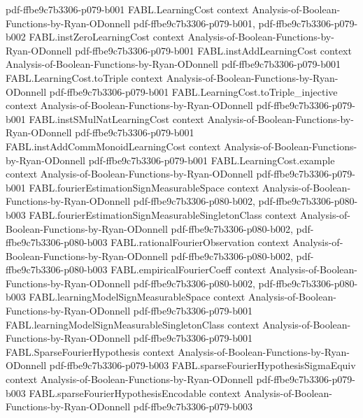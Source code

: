 \begin{theorem}
  {pdf-ffbe9c7b3306-p079-b001}
\proofstep
  {FABL.LearningCost}
  {context}
  {Analysis-of-Boolean-Functions-by-Ryan-ODonnell}
  {pdf-ffbe9c7b3306-p079-b001,
    pdf-ffbe9c7b3306-p079-b002}
\proofstep
  {FABL.instZeroLearningCost}
  {context}
  {Analysis-of-Boolean-Functions-by-Ryan-ODonnell}
  {pdf-ffbe9c7b3306-p079-b001}
\proofstep
  {FABL.instAddLearningCost}
  {context}
  {Analysis-of-Boolean-Functions-by-Ryan-ODonnell}
  {pdf-ffbe9c7b3306-p079-b001}
\proofstep
  {FABL.LearningCost.toTriple}
  {context}
  {Analysis-of-Boolean-Functions-by-Ryan-ODonnell}
  {pdf-ffbe9c7b3306-p079-b001}
\proofstep
  {FABL.LearningCost.toTriple_injective}
  {context}
  {Analysis-of-Boolean-Functions-by-Ryan-ODonnell}
  {pdf-ffbe9c7b3306-p079-b001}
\proofstep
  {FABL.instSMulNatLearningCost}
  {context}
  {Analysis-of-Boolean-Functions-by-Ryan-ODonnell}
  {pdf-ffbe9c7b3306-p079-b001}
\proofstep
  {FABL.instAddCommMonoidLearningCost}
  {context}
  {Analysis-of-Boolean-Functions-by-Ryan-ODonnell}
  {pdf-ffbe9c7b3306-p079-b001}
\proofstep
  {FABL.LearningCost.example}
  {context}
  {Analysis-of-Boolean-Functions-by-Ryan-ODonnell}
  {pdf-ffbe9c7b3306-p079-b001}
\proofstep
  {FABL.fourierEstimationSignMeasurableSpace}
  {context}
  {Analysis-of-Boolean-Functions-by-Ryan-ODonnell}
  {pdf-ffbe9c7b3306-p080-b002,
    pdf-ffbe9c7b3306-p080-b003}
\proofstep
  {FABL.fourierEstimationSignMeasurableSingletonClass}
  {context}
  {Analysis-of-Boolean-Functions-by-Ryan-ODonnell}
  {pdf-ffbe9c7b3306-p080-b002,
    pdf-ffbe9c7b3306-p080-b003}
\proofstep
  {FABL.rationalFourierObservation}
  {context}
  {Analysis-of-Boolean-Functions-by-Ryan-ODonnell}
  {pdf-ffbe9c7b3306-p080-b002,
    pdf-ffbe9c7b3306-p080-b003}
\proofstep
  {FABL.empiricalFourierCoeff}
  {context}
  {Analysis-of-Boolean-Functions-by-Ryan-ODonnell}
  {pdf-ffbe9c7b3306-p080-b002,
    pdf-ffbe9c7b3306-p080-b003}
\proofstep
  {FABL.learningModelSignMeasurableSpace}
  {context}
  {Analysis-of-Boolean-Functions-by-Ryan-ODonnell}
  {pdf-ffbe9c7b3306-p079-b001}
\proofstep
  {FABL.learningModelSignMeasurableSingletonClass}
  {context}
  {Analysis-of-Boolean-Functions-by-Ryan-ODonnell}
  {pdf-ffbe9c7b3306-p079-b001}
\proofstep
  {FABL.SparseFourierHypothesis}
  {context}
  {Analysis-of-Boolean-Functions-by-Ryan-ODonnell}
  {pdf-ffbe9c7b3306-p079-b003}
\proofstep
  {FABL.sparseFourierHypothesisSigmaEquiv}
  {context}
  {Analysis-of-Boolean-Functions-by-Ryan-ODonnell}
  {pdf-ffbe9c7b3306-p079-b003}
\proofstep
  {FABL.sparseFourierHypothesisEncodable}
  {context}
  {Analysis-of-Boolean-Functions-by-Ryan-ODonnell}
  {pdf-ffbe9c7b3306-p079-b003}

\end{theorem}
